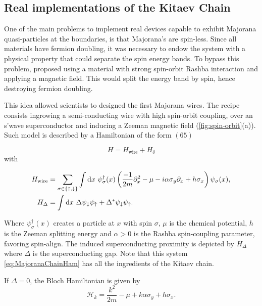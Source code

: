 % 
% 
\subsection{Real implementations of the Kitaev Chain \label{sec:exp}} 

 One of the main problems to implement real devices capable to exhibit Majorana quasi-particles at the boundaries, is that Majorana's are spin-less. Since all materials have fermion doubling,  it was necessary to endow the system with a physical property that could separate the spin energy bands. To bypass this problem, \citeauthor{lutchyn_majorana_2010}  proposed using a material with strong spin-orbit Rashba interaction \cite{manchon_new_2015} and applying a magnetic field. This would split the energy band by spin, hence destroying fermion doubling. 

This idea allowed scientists to designed the first Majorana wires. The recipe consists ingrowing a semi-conducting wire with high spin-orbit coupling, over an s'wave superconductor and inducing a Zeeman magnetic field (\ref{fig:spin-orbit}(a)). Such model is described by a Hamiltonian of the form \cite{alicea_new_2012}$(65)$

\begin{equation}
H = H_{\text{wire}} + H_\delta \label{eq:MajoranaChainHam}
\end{equation}
 with 

\begin{align}
    H_{\text{wire}} &= \sum_{\sigma \in \{\up , \dw\}} \int\mbox{d}x\ \psi^{\dagger}_\sigma(x)\left(\frac{-1}{2m}\partial_x^{2}-\mu -i\alpha\sigma_{y}\partial_x+h\sigma_{x}\right)\psi_\sigma(x),  
    \\
    H_\Delta &= \int\mbox{d} x\  \Delta\psi_{\downarrow}\psi_{\uparrow}+\Delta^{*}\psi_{\downarrow}\psi_{\uparrow}. 
\end{align}
    

\noindent Where $\psi^{\dagger}_\sigma(x)$ creates a particle at $x$ with spin $\sigma$, $\mu$ is the chemical potential, $h$ is the Zeeman splitting energy and $\alpha > 0$ is the Rashba spin-coupling parameter, favoring spin-align. The induced superconducting proximity is depicted by $H_\Delta$ where $\Delta$ is the superconducting gap. Note that this system \eqref{eq:MajoranaChainHam} has all the ingredients of the Kitaev chain. 


 If $\Delta =0$, the Bloch Hamiltonian is given by 
 \begin{equation}
 \mathcal{H}_k = \frac{k^2}{2m} -\mu + k\alpha \sigma_y +h\sigma_x.
 \end{equation}

